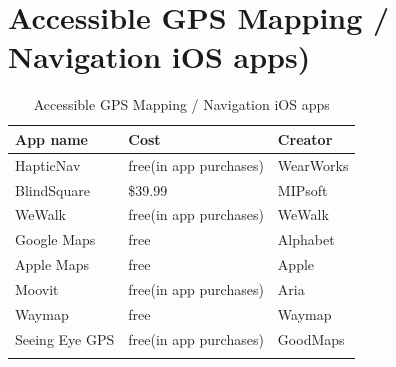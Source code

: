 \documentclass[14pt, letterpaper,twoside]{extreport}
\begin{document}
\hypertarget{accessible-gps}{%
    \chapter*{Accessible GPS Mapping / Navigation iOS apps)}\label{accessible-gps}}


\begin{longtable}[]{@{}
    >{\raggedright\arraybackslash}p{}
    >{\raggedright\arraybackslash}p{}
    >{\raggedright\arraybackslash}p{}@{}
    }
    \toprule\noalign{}
    \textbf{App name} & \textbf{Cost}          & \textbf{Creator} \\
    \midrule\noalign{}
    \endhead
    \bottomrule\noalign{}
    \endlastfoot
    HapticNav         & free(in app purchases) & WearWorks        \\[1.0em]
    BlindSquare       & \$39.99                & MIPsoft          \\[1.0em]
    WeWalk            & free(in app purchases) & WeWalk           \\[1.0em]
    Google Maps       & free                   & Alphabet         \\[1.0em]
    Apple Maps        & free                   & Apple            \\[1.0em]
    Moovit            & free(in app purchases) & Aria             \\[1.0em]
    Waymap            & free                   & Waymap           \\[1.0em]
    Seeing Eye GPS    & free(in app purchases) & GoodMaps         \\[1.0em]\hline
    \caption{Accessible GPS Mapping / Navigation iOS apps }
\end{longtable}
\end{document}

